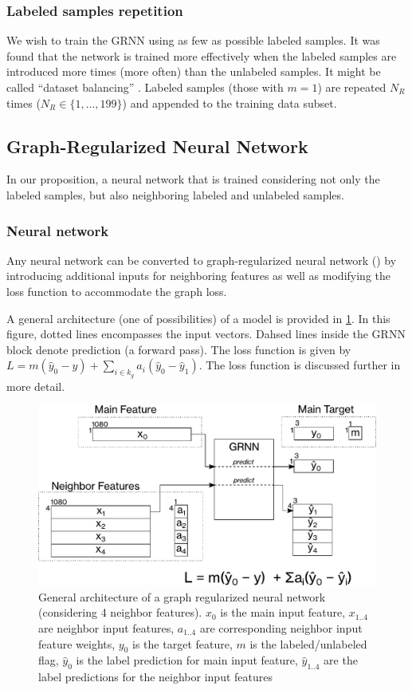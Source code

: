 \documentclass[applsci,article,submit,moreauthors,pdftex]{Definitions/mdpi}
\begin{document}
\subsubsection{Labeled samples repetition}
We wish to train the GRNN using as few as possible labeled samples. It was found that the network is trained more effectively when the labeled samples are introduced more times (more often) than the unlabeled samples. It might be called ``dataset balancing'' \cite{}. 
Labeled samples (those with $ m =  1 $) are repeated $ N_R $ times ($ N_R \in \{1,\dots,199\}$) and appended to the training data subset.

\subsection{Graph-Regularized Neural Network}

In our proposition, a neural network that is trained considering not only the labeled samples, but also neighboring labeled and unlabeled samples.

\subsubsection{Neural network}

Any neural network can be converted to graph-regularized neural network (\grnn) by introducing additional inputs for neighboring features as well as modifying the loss function to accommodate the graph loss.

A general architecture (one of possibilities) of a \grnn model is provided in \figurename{} \ref{fig:networktraining}. In this figure, dotted lines encompasses the input vectors. Dahsed lines inside the GRNN block denote prediction (a forward pass). The loss function is given by $ L = m(\hat{y}_0-y) + \sum_{i \in k_g}a_i(\hat{y}_0 - \hat{y}_1) $. The loss function is discussed further in more detail.

\begin{figure}
	\centering
	\includegraphics[width=0.5\linewidth]{img/network_training}
	\caption{General architecture of a graph regularized neural network (considering 4 neighbor features). $ x_0 $ is the main input feature, $ x_{1..4} $ are neighbor input features, $ a_{1..4} $ are corresponding neighbor input feature weights, $ y_0 $ is the target feature, $ m $ is the labeled/unlabeled flag, $ \hat{y}_0 $ is the label prediction for main input feature, $ \hat{y}_{1..4} $ are the label predictions for the neighbor input features}
	\label{fig:networktraining}
\end{figure}
\end{document}
